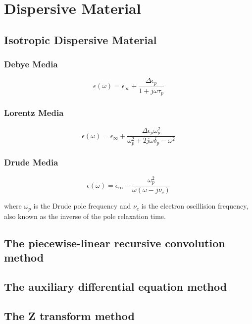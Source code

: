 \section{Dispersive Material}

\subsection{Isotropic Dispersive Material}
\subsubsection{Debye Media}

\begin{displaymath}
  \epsilon(\omega) = \epsilon_{\infty} + \frac{\Delta\epsilon_p}{1+j\omega\tau_p}
\end{displaymath}

\subsubsection{Lorentz Media}


\begin{displaymath}
  \epsilon(\omega) = \epsilon_{\infty} + \frac{\Delta\epsilon_p\omega_p^2}{\omega_p^2 + 2j\omega\delta_p - \omega^2}
\end{displaymath}


\subsubsection{Drude Media}

\begin{displaymath}
  \epsilon(\omega) = \epsilon_{\infty} - \frac{\omega_p^2}{\omega(\omega-j\nu_c)}
\end{displaymath}

where $\omega_p$ is the Drude pole frequency and $\nu_c$ is the electron oscillision frequency, also known as the
inverse of the pole relaxation time.

\subsection{The piecewise-linear recursive convolution method}

\subsection{The auxiliary differential equation method}

\subsection{The Z transform method}
